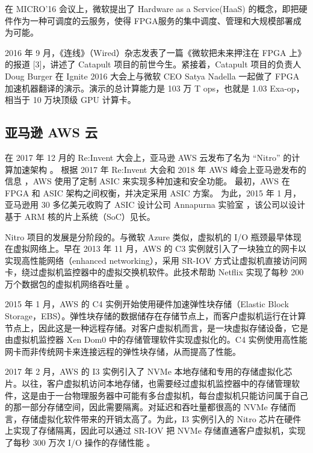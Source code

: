 在 MICRO’16 会议上，微软提出了 Hardware as a Service(HaaS) 的概念，即把硬件作为一种可调度的云服务，使得 FPGA服务的集中调度、管理和大规模部署成为可能。


2016 年 9 月，《连线》（Wired）杂志发表了一篇《微软把未来押注在 FPGA 上》的报道 [3]，讲述了 Catapult 项目的前世今生。紧接着，Catapult 项目的负责人 Doug Burger 在 Ignite 2016 大会上与微软 CEO Satya Nadella 一起做了 FPGA 加速机器翻译的演示。演示的总计算能力是 103 万 T ops，也就是 1.03 Exa-op，相当于 10 万块顶级 GPU 计算卡。



\subsection{亚马逊 AWS 云}

在 2017 年 12 月的 Re:Invent 大会上，亚马逊 AWS 云发布了名为 ``Nitro'' 的计算加速架构 \cite{nitro-blog}。
根据 2017 年 Re:Invent 大会和 2018 年 AWS 峰会上亚马逊发布的信息 \cite{nitro-talk,nitro-web}，AWS 使用了定制 ASIC 来实现多种加速和安全功能。
最初，AWS 在 FPGA 和 ASIC 架构之间权衡，并决定采用 ASIC 方案。
为此，2015 年 1 月，亚马逊用 30 多亿美元收购了 ASIC 设计公司 Annapurna 实验室 \cite{annapurna}，该公司以设计基于 ARM 核的片上系统（SoC）见长。

Nitro 项目的发展是分阶段的。与微软 Azure 类似，虚拟机的 I/O 瓶颈最早体现在虚拟网络上。早在 2013 年 11 月，AWS 的 C3 实例就引入了一块独立的网卡以实现高性能网络（enhanced networking），采用 SR-IOV 方式让虚拟机直接访问网卡，绕过虚拟机监控器中的虚拟交换机软件。此技术帮助 Netflix 实现了每秒 200 万个数据包的虚拟机网络吞吐量 \cite{netflix-aws}。

2015 年 1 月，AWS 的 C4 实例开始使用硬件加速弹性块存储（Elastic Block Storage，EBS）。弹性块存储的数据储存在存储节点上，而客户虚拟机运行在计算节点上，因此这是一种远程存储。对客户虚拟机而言，是一块虚拟存储设备，它是由虚拟机监控器 Xen Dom0 中的存储管理软件实现虚拟化的。C4 实例使用高性能网卡而非传统网卡来连接远程的弹性块存储，从而提高了性能。

2017 年 2 月，AWS 的 I3 实例引入了 NVMe 本地存储和专用的存储虚拟化芯片。以往，客户虚拟机访问本地存储，也需要经过虚拟机监控器中的存储管理软件，这是由于一台物理服务器中可能有多台虚拟机，每台虚拟机只能访问属于自己的那一部分存储空间，因此需要隔离。对延迟和吞吐量都很高的 NVMe 存储而言，存储虚拟化软件带来的开销太高了。为此，I3 实例引入的 Nitro 芯片在硬件上实现了存储隔离，因此可以通过 SR-IOV 把 NVMe 存储直通客户虚拟机，实现了每秒 300 万次 I/O 操作的存储性能 \cite{aws-local-storage}。

